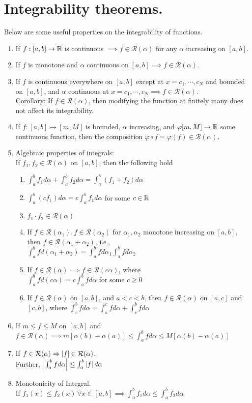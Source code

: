 \section{Integrability theorems.}
Below are some useful properties on the integrability of functions.
\begin{enumerate}
\item If $f:[a,b]\to\mathbb{R}$ is continuous $\implies f\in \mathcal{R}(\alpha)$ for any $\alpha$ increasing on $[a,b]$.
\item If $f$ is monotone and $\alpha$ continuous on $[a,b]\implies f\in \mathcal{R}(\alpha)$.
\item If $f$ is continuous everywhere on $[a,b]$ except at $x=c_1,\cdots,c_N$ and bounded on $[a,b]$, and $\alpha$ continuous at $x=c_1,\cdots,c_N\implies f\in\mathcal{R}(\alpha)$.\\
Corollary: If $f\in\mathcal{R}(\alpha)$, then modifying the function at finitely many  does not affect its integrability.
\item If $f:[a,b]\to[m,M]$ is bounded, $\alpha$ increasing, and $\varphi [m,M]\to \mathbb{R}$ some continuous function, then the composition $\varphi\circ f=\varphi(f)\in\mathcal R(\alpha)$.
\item Algebraic properties of integrals:\\
If $f_1,f_2\in\mathcal{R}(\alpha)$ on $[a,b]$, then the following hold
\begin{enumerate}[label=(5\alph*)]
\item $\int^b_a f_1d\alpha+\int^b_a f_2d\alpha=\int^b_a (f_1+f_2)d\alpha$
\item $\int^b_a (cf_1)d\alpha=c\int^b_a f_1d\alpha$ for some $c\in\mathbb{R}$
\item $f_1\cdot f_2\in\mathcal{R}(\alpha)$
\item If $f\in\mathcal{R}(\alpha_1),f\in\mathcal{R}(\alpha_2)$ for $\alpha_1,\alpha_2$ monotone increasing on $[a,b]$, then $f\in\mathcal{R}(\alpha_1+\alpha_2)$, i.e.,\\
$\int^b_a f d(\alpha_1+\alpha_2) = \int^b_a f d\alpha_1 \int^b_a f d\alpha_2$
\item If $f\in\mathcal{R}(\alpha)\implies f\in\mathcal{R}(c\alpha)$, where\\
$\int^b_afd(c\alpha) = c\int^b_afd\alpha$ for some $c\geq 0$
\item If $f\in\mathcal{R}(\alpha)$ on $[a,b]$, and $a<c<b$, then $f\in\mathcal{R}(\alpha)$ on $[a,c]$ and $[c,b]$, where
$\int^b_c fd\alpha = \int^c_a fd\alpha + \int^b_c fd\alpha$
\end{enumerate}
\item If $m\leq f\leq M$ on $[a,b]$ and $f\in\mathcal{R}(\alpha)\implies m[\alpha(b)-\alpha(a)]\leq \int^b_a fd\alpha\leq M[\alpha(b)- \alpha(a)]$
\item If $f\in\mathcal{R}(\alpha)\Rightarrow \left\lvert f\right\rvert\in\mathcal{R}(\alpha)$.\\
Further, $\left\lvert\int^b_afd\alpha\right\rvert\leq \int^b_a\left\lvert f\right\rvert d\alpha$
\item Monotonicity of Integral.\\
If $f_1(x)\leq f_2(x)\,\forall x\in[a,b]\implies \int^b_a f_1d\alpha\leq \int^b_a f_2d\alpha$
\end{enumerate}

